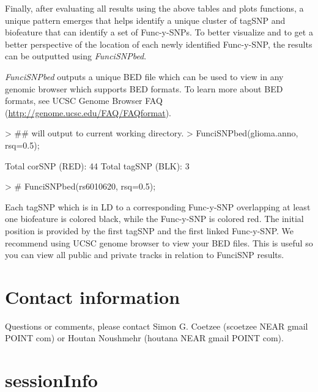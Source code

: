 \documentclass[12pt,fullpage]{article}
\newcommand{\Rmethod}[1]{{\textit{#1}}}
\begin{document}
Finally, after evaluating all results using the above tables and plots
functions, a unique pattern emerges that helps identify a unique cluster of
tagSNP and biofeature that can identify a set of Func-y-SNPs. To better
visualize and to get a better perspective of the location of each newly
identified Func-y-SNP, the results can be outputted using \Rmethod{FunciSNPbed}.

\Rmethod{FunciSNPbed} outputs a unique BED file which can be used to view in any
genomic browser which supports BED formats. To learn more about BED formats, see
UCSC Genome Browser FAQ (\url{http://genome.ucsc.edu/FAQ/FAQformat}). 

\begin{Schunk}
\begin{Sinput}
> ## will output to current working directory.
> FunciSNPbed(glioma.anno, rsq=0.5);
\end{Sinput}
\begin{Soutput}
Total corSNP (RED):  44 
Total tagSNP (BLK):  3 
\end{Soutput}
\begin{Sinput}
> # FunciSNPbed(rs6010620, rsq=0.5);
\end{Sinput}
\end{Schunk}

Each tagSNP which is in LD to a corresponding Func-y-SNP overlapping at least
one biofeature is colored black, while the Func-y-SNP is colored red. The
initial position is provided by the first tagSNP and the first linked
Func-y-SNP. We recommend using UCSC genome browser to view your BED files. This
is useful so you can view all public and private tracks in relation to FunciSNP
results.


\section{Contact information}
Questions or comments, please contact Simon G. Coetzee (scoetzee NEAR gmail 
 POINT com) or Houtan Noushmehr (houtana NEAR gmail POINT com).

\section{sessionInfo}                                                            
\end{document}
